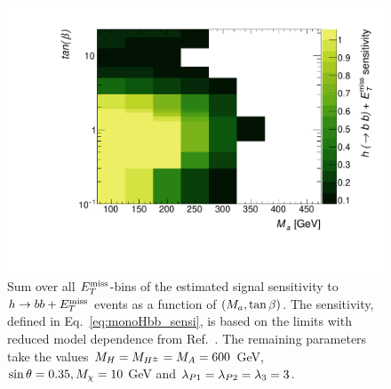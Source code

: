\begin{figure}[tbp]
\centering
\includegraphics[width=\textwidth]{texinputs/04_grid/figures/monoHbb_sensi_sum_bins_1_2_3_4_ma_vs_tanb_lin.pdf}
\caption[Sensitivity to $h\rightarrow bb + \MET$ signals in $\mA$ - $\tanb$ plane, summed across $\MET$ bins]
{
Sum over all $\MET$-bins of the estimated signal sensitivity to $h\rightarrow bb + \MET$ events as a function of $(M_{a},\tan\beta)$. The sensitivity, defined in Eq.~\ref{eq:monoHbb_sensi}, is based on the limits with reduced model dependence from Ref.~\cite{Aaboud:2017yqz}. The remaining parameters take the values
$ M_{H}=M_{H^{\pm}}=M_{A} = 600$ GeV, $ \sin\theta = 0.35, M_{\chi} = 10$ GeV and $ \lambda_{P1} = \lambda_{P2} = \lambda_{3} = 3 $.}
\label{fig:monoHbb_sensi_full_ma_tanb}
\end{figure}

